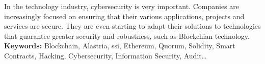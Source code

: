In the technology industry, cybersecurity is very important.  Companies are increasingly focused on ensuring that their various applications, projects and services are secure.  They are even starting to adapt their solutions to technologies that guarantee greater security and robustness, such as Blockchian technology.\\

\textbf{Keywords:} Blockchain, Alastria, ssi, Ethereum, Quorum, Solidity, Smart Contracts, Hacking, Cybersecurity, Information Security, Audit\ldots


